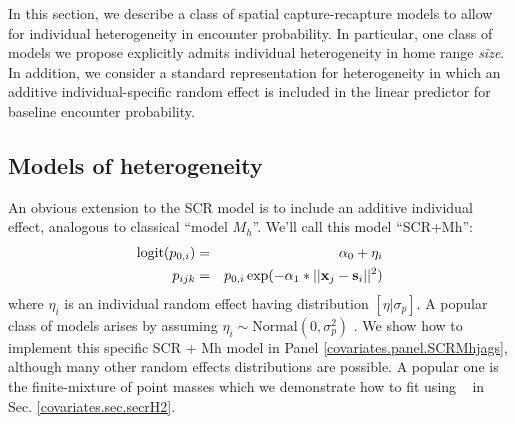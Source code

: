 In this section, we describe a class of spatial capture-recapture
models to allow for individual heterogeneity in encounter
probability.  In particular, one class of models we propose explicitly
admits individual heterogeneity in home range {\it size}. In addition,
we consider a standard representation for heterogeneity in which an
additive individual-specific random effect is included in the linear
predictor for baseline encounter probability.  

\subsection{Models of heterogeneity}
\label{covariates.sec.heterogeneity}

An obvious extension to the SCR model is to include an additive
individual effect, analogous to classical ``model $M_{h}$''. We'll
call this model ``SCR+Mh'':
\begin{eqnarray*}
\mbox{logit}(p_{0,i})& =& \alpha_0 + \eta_{i} \\
p_{ijk}& = &p_{0,i} \exp(- \alpha_1*||{\bf x}_{j}-{\bf s}_{i}||^2)
\end{eqnarray*}
where $\eta_{i}$ is an individual random effect having distribution
$[\eta|\sigma_{p}]$.  A popular class of models arises by assuming
$\eta_{i} \sim \mbox{Normal}(0,\sigma_{p}^{2})$ \citep{coull_agresti:1999,
dorazio_royle:2003}. 
We show how to implement this specific SCR + Mh model in 
Panel \ref{covariates.panel.SCRMhjags}, although
many other random effects
distributions are possible. A popular one is the finite-mixture of
point masses
\citep{norris_pollock:1996, pledger:2000} which 
we demonstrate how to fit using \secr~ in
Sec. \ref{covariates.sec.secrH2}.  

